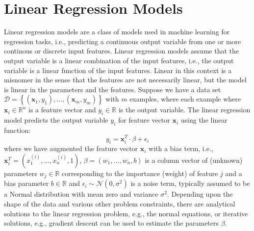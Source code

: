 \documentclass{article}[12pt]
\def\R{\mathbb{R}}
\begin{document}
\section{Linear Regression Models}
Linear regression models are a class of models used in machine learning for regression tasks, i.e., predicting a continuous output variable from one or more continous or discrete input features.
Linear regression models assume that the output variable is a linear combination of the input features, i.e., the output variable is a linear function of the input features.
Linear in this context is a misnomer in the sense that the features are not necessarily linear, but the model is linear in the parameters and the features.
Suppose we have a data set $\mathcal{D} = \left\{(\mathbf{x}_{1},y_{1}),\dotsc,(\mathbf{x}_{m},y_{m})\right\}$ with $m$ examples, where each example where $\mathbf{x}_{i}\in\R^{n}$ is a feature vector and $y_{i}\in\R$ is the output variable.
The linear regression model predicts the output variable $y_{i}$ for feature vector $\mathbf{x}_{i}$ using the linear function:
\begin{equation*}
    y_{i} = \mathbf{x}_{i}^{T}\cdot\beta + \epsilon_{i}
\end{equation*}
where we have augmented the feature vector $\mathbf{x}_{i}$ with a bias term, i.e., $\mathbf{x}_{i}^{T} = \left(x^{(i)}_{1},\dots,x^{(i)}_{n},1\right)$, $\beta = \left(w_{1},\dots,w_{n},b\right)$ is a column vector of (unknown) parameters $w_{j}\in\R$ corresponding to the importance (weight) of feature $j$ and a bias parameter $b\in\R$
and $\epsilon_{i}\sim\mathcal{N}(0,\sigma^{2})$ is a noise term, typically assumed to be a Normal distribution with mean zero and variance $\sigma^{2}$.
Depending upon the shape of the data and various other problem constraints, there are analytical solutions to the linear regression problem, e.g., the normal equations, or iterative solutions, e.g., gradient descent can be used to estimate the parameters $\beta$.
\end{document}

